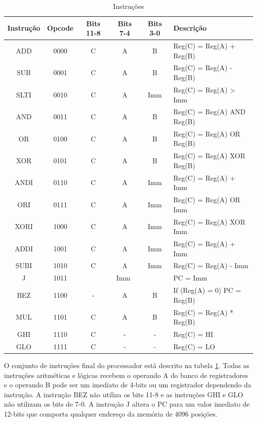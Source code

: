 \documentclass[11pt,a4paper,titlepage]{article}
\begin{document}
\begin{table}[!h]
\centering
\begin{tabular}{| c | c | c | c | c | l |}
\hline
Instrução & Opcode & Bits 11-8 & Bits 7-4 & Bits 3-0 & Descrição \\
\hline
\hline
 ADD  & 0000 & C & A & B   & Reg(C) = Reg(A) + Reg(B) \\
\hline
 SUB  & 0001 & C & A & B   & Reg(C) = Reg(A) - Reg(B) \\
\hline
 SLTI & 0010 & C & A & Imm & Reg(C) = Reg(A) > Imm \\
\hline
 AND  & 0011 & C & A & B   & Reg(C) = Reg(A) AND Reg(B) \\
\hline
 OR   & 0100 & C & A & B   & Reg(C) = Reg(A) OR Reg(B) \\
\hline
 XOR  & 0101 & C & A & B   & Reg(C) = Reg(A) XOR Reg(B) \\
\hline
 ANDI & 0110 & C & A & Imm & Reg(C) = Reg(A) + Imm \\
\hline
 ORI  & 0111 & C & A & Imm & Reg(C) = Reg(A) OR Imm \\
\hline
 XORI & 1000 & C & A & Imm & Reg(C) = Reg(A) XOR Imm \\
\hline
 ADDI & 1001 & C & A & Imm & Reg(C) = Reg(A) + Imm \\
\hline
 SUBI & 1010 & C & A & Imm & Reg(C) = Reg(A) - Imm \\
\hline
 J    & 1011 & \multicolumn{3}{c|}{Imm} & PC = Imm \\
\hline
 BEZ  & 1100 & - & A & B   & If (Reg(A) = 0) PC = Reg(B) \\
\hline
 MUL  & 1101 & C & A & B   & Reg(C) = Reg(A) * Reg(B) \\
\hline
 GHI  & 1110 & C & - & -   & Reg(C) = HI \\
\hline
 GLO  & 1111 & C & - & -   & Reg(C) = LO \\
\hline
\end{tabular}
\caption{Instruções}
\label{tab:instructions}
\end{table}
%

O conjunto de instruções final do processador está descrito na tabela \ref{tab:instructions}.
Todas as instruções aritméticas e lógicas recebem o operando A do banco de registradores e o
operando B pode ser um imediato de 4-bits ou um registrador dependendo da instrução. A instrução
BEZ não utiliza os bits 11-8 e as instruções GHI e GLO não utilizam os bits de 7-0. A instrução
J altera o PC para um valor imediato de 12-bits que comporta qualquer endereço da memória de
4096 posições.
\end{document}
